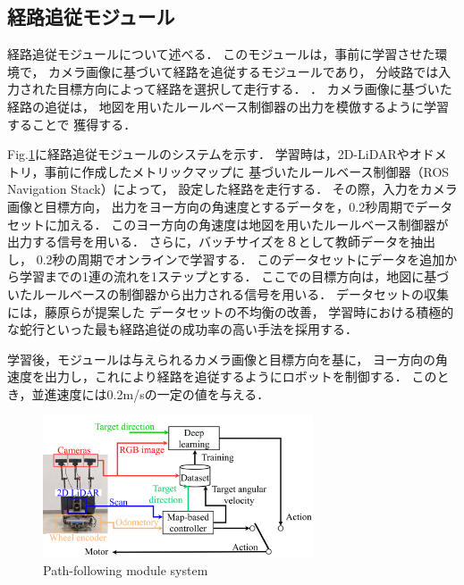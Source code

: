 \documentclass{sice-si}
\begin{document}
\subsection{経路追従モジュール}
経路追従モジュールについて述べる．
このモジュールは，事前に学習させた環境で，
カメラ画像に基づいて経路を追従するモジュールであり，
分岐路では入力された目標方向によって経路を選択して走行する．
．
カメラ画像に基づいた経路の追従は，
地図を用いたルールベース制御器の出力を模倣するように学習することで
獲得する\cite{haruyama2022}\cite{fujiwara2023}．
\par
Fig.\ref{fig:learning}に経路追従モジュールのシステムを示す．
学習時は，2D-LiDARやオドメトリ，事前に作成したメトリックマップに
基づいたルールベース制御器（ROS Navigation Stack\cite{ros-navigation}）によって，
設定した経路を走行する．
その際，入力をカメラ画像と目標方向，
出力をヨー方向の角速度とするデータを，0.2秒周期でデータセットに加える．
このヨー方向の角速度は地図を用いたルールベース制御器が出力する信号を用いる．
さらに，バッチサイズを８として教師データを抽出し，
0.2秒の周期でオンラインで学習する．
このデータセットにデータを追加から学習までの1連の流れを1ステップとする．
ここでの目標方向は，地図に基づいたルールベースの制御器から出力される信号を用いる．
データセットの収集には，藤原ら\cite{fujiwara2023}が提案した
データセットの不均衡の改善，
学習時における積極的な蛇行といった最も経路追従の成功率の高い手法を採用する．
\par
学習後，モジュールは与えられるカメラ画像と目標方向を基に，
ヨー方向の角速度を出力し，これにより経路を追従するようにロボットを制御する．
このとき，並進速度には0.2m/sの一定の値を与える．
\begin{figure}[htbp]
    \centering
     \includegraphics[width=80mm]{./figs/system_learning.pdf}
     \caption{Path-following module system}\label{fig:learning}
\end{figure}
\end{document}
